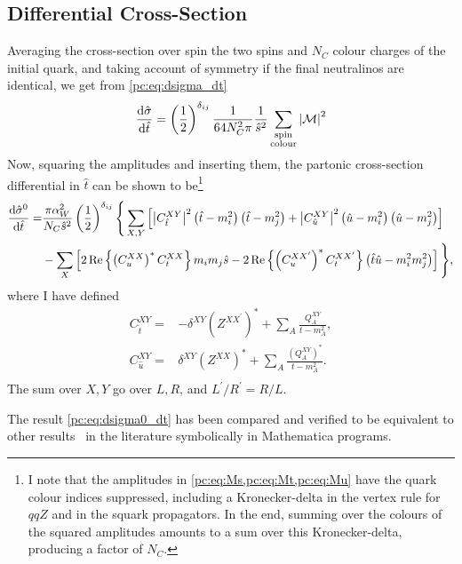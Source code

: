 \documentclass[../main.tex]{subfiles}
\begin{document}
\subsection{Differential Cross-Section}
Averaging the cross-section over spin the two spins and \(N_C\) colour charges of the initial quark, and taking account of symmetry if the final neutralinos are identical, we get from \cref{pc:eq:dsigma_dt}
\begin{equation}
  \label{pc:eq:dxsec}
  \d[\hat{t}]{\hat{\sigma}} = \pclosed{\frac{1}{2}}^{\delta_{ij}} \frac{1}{64 N_C^2 \pi} \frac{1}{\hat{s}^2} \sum_{\substack{\text{spin}\\\text{colour}}} \abs{\M}^2
\end{equation}
Now, squaring the amplitudes and inserting them, the partonic cross-section differential in \(\hat{t}\) can be shown to be\footnote{I note that the amplitudes in \cref{pc:eq:Ms,pc:eq:Mt,pc:eq:Mu} have the quark colour indices suppressed, including a Kronecker-delta in the vertex rule for \(qqZ\) and in the squark propagators. In the end, summing over the colours of the squared amplitudes amounts to a sum over this Kronecker-delta, producing a factor of \(N_C\).}
\begin{align}
  \label{pc:eq:dsigma0_dt}
  \nonumber
  \d[\hat{t}]{\hat{\sigma}^0} = & \frac{\pi \alpha_W^2}{N_C \hat{s}^2}
  \pclosed{\frac{1}{2}}^{\delta_{ij}} \Bigg\{ \sum_{X,Y}
  \bclosed{\abs{C^{XY}_{\hat{t}}}^2
    \pclosed{\hat{t}-m_i^2}\pclosed{\hat{t}-m_j^2} +
    \abs{C^{XY}_{\hat{u}}}^2
  \pclosed{\hat{u}-m_i^2}\pclosed{\hat{u}-m_j^2}}                      \\
                                & - \sum_X
  \bclosed{2\Re{\pclosed{C_{u}^{XX}}^\ast C_{t}^{XX}} m_i m_j \hat{s} -
    2\Re{\pclosed{C_{u}^{XX^\prime}}^\ast C_{t}^{XX^\prime}}
    \pclosed{\hat{t}\hat{u} - m_i^2m_j^2}} \Bigg\},
\end{align}
where I have defined
\begin{subequations}
  \begin{align}
    C_{\hat{t}}^{XY} = & -\delta^{XY} (Z^{XX^\prime})^\ast + \sum_{A}\frac{Q_A^{XY}}{t-m_A^2}, \\
    C_{\hat{u}}^{XY} = & \delta^{XY} (Z^{XX})^\ast + \sum_{A}\frac{(Q_A^{XY})^\ast}{t-m_A^2}.  \\
  \end{align}
\end{subequations}
The sum over \(X, Y\) go over \(L, R\), and \(L^\prime/R^\prime = R/L\).

The result \cref{pc:eq:dsigma0_dt} has been compared and verified to be equivalent to other results~\cite{Debove:2010kf} in the literature symbolically in Mathematica programs.
\end{document}
